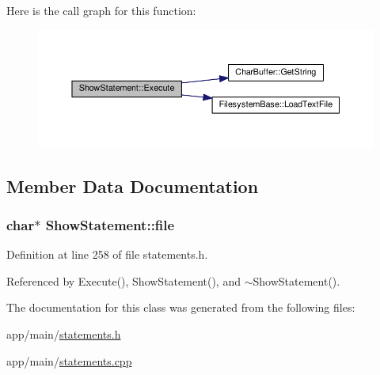 Here is the call graph for this function\+:\nopagebreak
\begin{figure}[H]
\begin{center}
\leavevmode
\includegraphics[width=350pt]{classShowStatement_a8466ad7e0e61918cda0e399713abb6a8_cgraph}
\end{center}
\end{figure}




\subsection{Member Data Documentation}
\subsubsection[{\texorpdfstring{file}{file}}]{\setlength{\rightskip}{0pt plus 5cm}char$\ast$ Show\+Statement\+::file\hspace{0.3cm}{\ttfamily [private]}}\hypertarget{classShowStatement_a2f2e42fedd30adf1fee5f68dabcd1f3f}{}\label{classShowStatement_a2f2e42fedd30adf1fee5f68dabcd1f3f}


Definition at line 258 of file statements.\+h.



Referenced by Execute(), Show\+Statement(), and $\sim$\+Show\+Statement().



The documentation for this class was generated from the following files\+:\begin{DoxyCompactItemize}
\item 
app/main/\hyperlink{statements_8h}{statements.\+h}\item 
app/main/\hyperlink{statements_8cpp}{statements.\+cpp}\end{DoxyCompactItemize}
